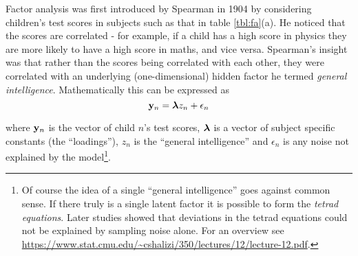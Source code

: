 \begin{table}
  \centering
{}
\hspace{5pt}
\caption{Children's test scores across subjects are correlated due to latent factors (a) in a similar 
way to the gene expression of key markers during differentiation (b).} \label{tbl:fa}
\end{table}

Factor analysis was first introduced by Spearman in 1904 \cite{spearman1904general} by considering children's test scores in subjects such as that in table \ref{tbl:fa}(a). He noticed that the scores are correlated - for example, if a child has a high score in physics they are more likely to have a high score in maths, and vice versa. Spearman's insight was that rather than the scores being correlated with each other, they were correlated with an underlying (one-dimensional) hidden factor he termed \emph{general intelligence}. Mathematically this can be expressed as
\begin{equation}
\mathbf{y}_n = \bm{\lambda} z_n + \epsilon_n
\end{equation}

where $\mathbf{y}_n$ is the vector of child $n$'s test scores, $\bm{\lambda}$ is a vector of subject specific constants (the ``loadings''), $z_n$ is the ``general intelligence'' and $\epsilon_n$ is any noise not explained by the model\footnote{
Of course the idea of a single ``general intelligence'' goes against common sense. If there truly is a single latent factor it is possible to form the \emph{tetrad equations}. Later studies showed that deviations in the tetrad equations could not be explained by sampling noise alone. For an overview see \url{https://www.stat.cmu.edu/~cshalizi/350/lectures/12/lecture-12.pdf}.
}.


